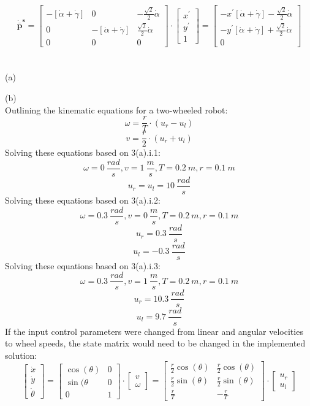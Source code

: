 \documentclass{article}
\begin{document}
\[
\bm{\mathbf{\dot{\overline{p}}^s}} = \begin{bmatrix}
    -\left[ \dot{\alpha} + \dot{\gamma} \right] & 0 & -\frac{\sqrt{2}}{2}\dot{\alpha} \\
    0 & -\left[ \dot{\alpha} + \dot{\gamma} \right] & \frac{\sqrt{2}}{2}\dot{\alpha} \\
    0 & 0 & 0
\end{bmatrix} \cdot \begin{bmatrix}
    x^{'} \\ y^{'} \\ 1
\end{bmatrix} = \begin{bmatrix}
    -x^{'}\left[ \dot{\alpha} + \dot{\gamma} \right] - \frac{\sqrt{2}}{2}\dot{\alpha} \\
    -y^{'}\left[ \dot{\alpha} + \dot{\gamma} \right] + \frac{\sqrt{2}}{2}\dot{\alpha} \\
    0
\end{bmatrix}
\]
\newpage
\section{}
(a)

(b)
\[\]
Outlining the kinematic equations for a two-wheeled robot:
\[
\omega = \frac{r}{T} \cdot (u_r - u_l)
\]
\[
v = \frac{r}{2} \cdot (u_r + u_l)
\]
Solving these equations based on 3(a).i.1:
\[
\omega = 0 \ \frac{rad}{s}, v = 1 \ \frac{m}{s}, T = 0.2 \ m, r = 0.1 \ m
\]
\[
u_r = u_l = 10 \ \frac{rad}{s}
\]
\[\]
Solving these equations based on 3(a).i.2:
\[
\omega = 0.3 \ \frac{rad}{s}, v = 0 \ \frac{m}{s}, T = 0.2 \ m, r = 0.1 \ m
\]
\[
u_r = 0.3 \ \frac{rad}{s}
\]
\[
u_l = -0.3 \ \frac{rad}{s}
\]
Solving these equations based on 3(a).i.3:
\[
\omega = 0.3 \ \frac{rad}{s}, v = 1 \ \frac{m}{s}, T = 0.2 \ m, r = 0.1 \ m
\]
\[
u_r = 10.3 \ \frac{rad}{s}
\]
\[
u_l = 9.7 \ \frac{rad}{s}
\]
\[\]
If the input control parameters were changed from linear and angular velocities to wheel speeds, the state matrix would need to be changed in the implemented solution:
\[
\begin{bmatrix}
    \dot{x} \\ \dot{y} \\ \dot{\theta}
\end{bmatrix} = 
\begin{bmatrix}
    \cos(\theta) & 0 \\ \sin(\theta & 0 \\ 0 & 1
\end{bmatrix} \cdot
\begin{bmatrix}
    v \\ \omega
\end{bmatrix} = \begin{bmatrix}
    \frac{r}{2}\cos(\theta) & \frac{r}{2}\cos(\theta) \\ \frac{r}{2}\sin(\theta) & \frac{r}{2}\sin(\theta) \\ \frac{r}{T} & -\frac{r}{T}
\end{bmatrix} \cdot \begin{bmatrix}
    u_r \\ u_l
\end{bmatrix}
\]
\newpage
\end{document}
